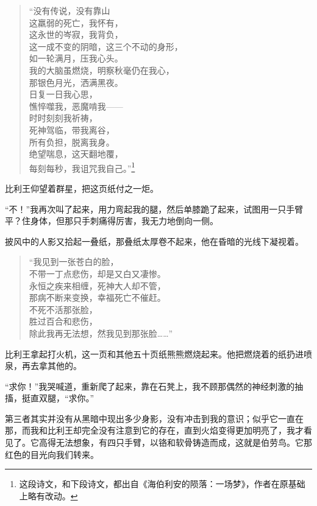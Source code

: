 \documentclass[AutoFakeBold=true]{book}
\begin{document}
\begin{quote}
	{\kaishu ``没有传说，没有靠山\\
	这羸弱的死亡，我怀有，\\
	这永世的岑寂，我背负，\\
	这一成不变的阴暗，这三个不动的身形，\\
	如一轮满月，压我心头。\\
	我的大脑虽燃烧，明察秋毫仍在我心，\\
	那银色月光，洒满黑夜。\\
	日复一日我心思，\\
	憔悴噬我，恶魔啃我——\\
	时时刻刻我祈祷，\\
	死神驾临，带我离谷，\\
	所有负担，脱离我身。\\
	绝望喘息，这天翻地覆，\\
	每刻每秒，我诅咒我自己。''}\footnote{这段诗文，和下段诗文，都出自《海伯利安的陨落：一场梦》，作者在原基础上略有改动。}
\end{quote}

比利王仰望着群星，把这页纸付之一炬。

``不！''我再次叫了起来，用力弯起我的腿，然后单膝跪了起来，试图用一只手臂平？住身体，但那只手刺痛得厉害，我无力地倒向一侧。

披风中的人影又拾起一叠纸，那叠纸太厚卷不起来，他在昏暗的光线下凝视着。

\begin{quote}
	{\kaishu ``我见到一张苍白的脸，\\
	不带一丁点悲伤，却是又白又凄惨。\\
	永恒之疾来相缠，死神大人却不管，\\
	那病不断来变换，幸福死亡不催赶。\\
	不死不活那张脸，\\
	胜过百合和悲伤，\\
	除此我再无法想，然我见到那张脸……''}
\end{quote}

比利王拿起打火机，这一页和其他五十页纸熊熊燃烧起来。他把燃烧着的纸扔进喷泉，再去拿其他的。

``求你！''我哭喊道，重新爬了起来，靠在石凳上，我不顾那偶然的神经刺激的抽搐，挺直双腿，``求你。''

第三者其实并没有从黑暗中现出多少身影，没有冲击到我的意识；似乎它一直在那，而我和比利王却完全没有注意到它的存在，直到火焰变得更加明亮了，我才看见了。它高得无法想象，有四只手臂，以铬和软骨铸造而成，这就是伯劳鸟。它那红色的目光向我们转来。
\end{document}
